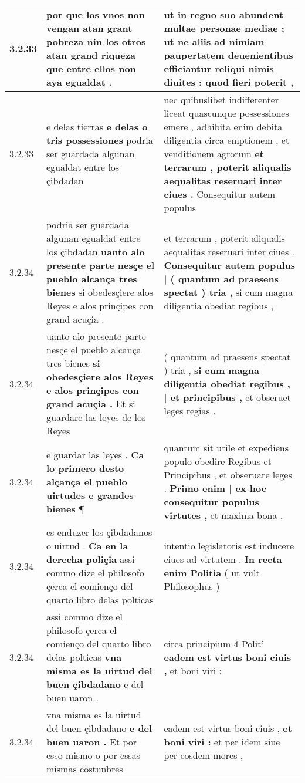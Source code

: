 \begin{tabular}{|p{1cm}|p{6.5cm}|p{6.5cm}|}
3.2.33 & por que los vnos non vengan atan grant pobreza \textbf{ nin los otros atan grand riqueza } que entre ellos non aya egualdat . & ut in regno suo abundent multae personae mediae ; \textbf{ ut ne aliis ad nimiam paupertatem deuenientibus efficiantur reliqui nimis diuites : } quod fieri poterit , \\\hline
3.2.33 & e delas tierras \textbf{ e delas o tris possessiones } podria ser guardada algunan egualdat entre los çibdadan & nec quibuslibet indifferenter liceat quascunque possessiones emere , adhibita enim debita diligentia circa emptionem , et venditionem agrorum \textbf{ et terrarum , poterit aliqualis aequalitas reseruari inter ciues . } Consequitur autem populus \\\hline
3.2.34 & podria ser guardada algunan egualdat entre los çibdadan \textbf{ uanto alo presente parte nesçe el pueblo alcança tres bienes } si obedesçiere alos Reyes e alos prinçipes con grand acuçia . & et terrarum , poterit aliqualis aequalitas reseruari inter ciues . \textbf{ Consequitur autem populus | ( quantum ad praesens spectat ) tria , } si cum magna diligentia obediat regibus , \\\hline
3.2.34 & uanto alo presente parte nesçe el pueblo alcança tres bienes \textbf{ si obedesçiere alos Reyes e alos prinçipes con grand acuçia . } Et si guardare las leyes de los Reyes & ( quantum ad praesens spectat ) tria , \textbf{ si cum magna diligentia obediat regibus , | et principibus , } et obseruet leges regias . \\\hline
3.2.34 & e guardar las leyes . \textbf{ Ca lo primero desto alçança el pueblo uirtudes e grandes bienes } ¶ & quantum sit utile et expediens populo obedire Regibus et Principibus , et obseruare leges . \textbf{ Primo enim | ex hoc consequitur populus virtutes , } et maxima bona . \\\hline
3.2.34 & es enduzer los çibdadanos o uirtud . \textbf{ Ca en la derecha poliçia } assi commo dize el philosofo çerca el comienço del quarto libro delas polticas & intentio legislatoris est inducere ciues ad virtutem . \textbf{ In recta enim Politia } ( ut vult Philosophus ) \\\hline
3.2.34 & assi commo dize el philosofo çerca el comienço del quarto libro delas polticas \textbf{ vna misma es la uirtud del buen çibdadano } e del buen uaron . & circa principium 4 Polit’ \textbf{ eadem est virtus boni ciuis , } et boni viri : \\\hline
3.2.34 & vna misma es la uirtud del buen çibdadano \textbf{ e del buen uaron . } Et por esso mismo o por essas mismas costunbres & eadem est virtus boni ciuis , \textbf{ et boni viri : } et per idem siue per eosdem mores , \\\hline

\end{tabular}
